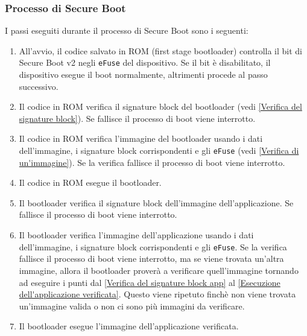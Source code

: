 \documentclass[a4paper]{article}
\begin{document}
\subsubsection{Processo di Secure Boot}
I passi eseguiti durante il processo di Secure Boot sono i seguenti:
\begin{enumerate}
  \item All'avvio, il codice salvato in ROM (first stage bootloader) controlla
    il bit di Secure Boot v2 negli \texttt{eFuse} del dispositivo. Se il bit è
    disabilitato, il dispositivo esegue il boot normalmente, altrimenti procede al
    passo successivo.

  \item Il codice in ROM verifica il signature block del bootloader
    (vedi \ref{Verifica del signature block}). Se fallisce
    il processo di boot viene interrotto. 

  \item Il codice in ROM verifica l'immagine del bootloader usando i dati dell'immagine,
    i signature block corrispondenti e gli \texttt{eFuse} (vedi \ref{Verifica di un'immagine}).
    Se la verifica fallisce il processo di boot viene interrotto.

  \item Il codice in ROM esegue il bootloader.

  \item Il bootloader verifica il signature block dell'immagine dell'applicazione.
    Se fallisce il processo di boot viene interrotto. \label{Verifica del signature block app}

  \item Il bootloader verifica l'immagine dell'applicazione usando i dati dell'immagine,
    i signature block corrispondenti e gli \texttt{eFuse}.
    Se la verifica fallisce il processo di boot viene interrotto, ma se viene trovata
    un'altra immagine, allora il bootloader proverà a verificare quell'immagine tornando
    ad eseguire i punti dal \ref{Verifica del signature block app} al
    \ref{Esecuzione dell'applicazione verificata}. Questo viene ripetuto finchè non viene
    trovata un'immagine valida o non ci sono più immagini da verificare.

  \item \label{Esecuzione dell'applicazione verificata}
    Il bootloader esegue l'immagine dell'applicazione verificata.
\end{enumerate}
\end{document}
